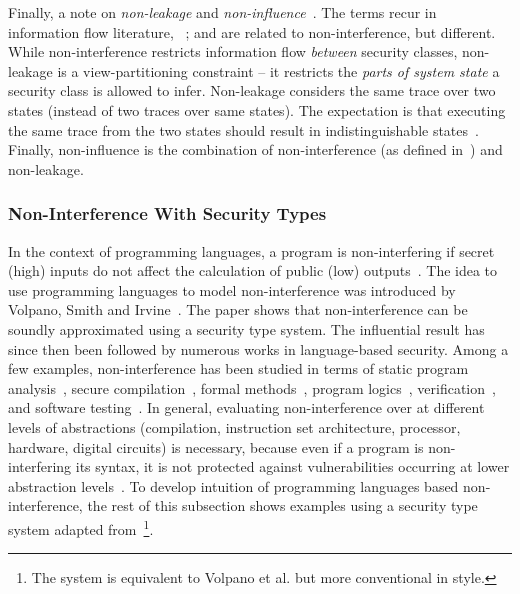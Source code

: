 Finally, a note on \emph{non-leakage} and \emph{non-influence}~\cite{vonoheimb2004}.
The terms recur in information flow literature, \eg~\cite{nelson2020,ileri2024};
and are related to {non-interference}, but different.
While non-interference restricts information flow \emph{between} security classes,
{{non-leakage}} is a view-partitioning constraint --
it restricts the \emph{parts of system state} a security class is allowed to infer.
Non-leakage considers the same trace over two states (instead of two traces over same states).
The expectation is that executing the same trace from the two states should result in indistinguishable states~\cite{nelson2020}.
Finally, {{non-influence}} is the combination of non-interference (as defined in~\cite{rushby1992}) and non-leakage.

\subsubsection{Non-Interference With Security Types}
\label{sec-types}

In the context of programming languages, a program is {non-interfering} if 
{secret (high) inputs} do not affect the calculation of {public (low) outputs}~\cite{sabelfeld2003}.
The idea to use programming languages to model {non-interference} was introduced by Volpano, Smith and Irvine~\cite{volpanoI1996}.
The paper shows that {non-interference} can be soundly approximated using a {security type system}.
The influential result has since then been followed by numerous works in language-based security.
Among a few examples, {non-interference} has been studied in terms of
static program analysis~\cite{barthe2007,huang2014},
{secure compilation}~\cite{patrignani2017,myers1999,cecchetti2017},
formal methods~\cite{kammuller2008,nelson2020},
program logics~\cite{frumin2021,karbyshev2018,garg2006,beringer2007},
verification~\cite{eilers2023},
and software {testing}~\cite{hritcu2013}.
In general, evaluating {non-interference} over at different levels of abstractions
(compilation, instruction set architecture, processor, hardware, digital circuits) is necessary,
because even if a program is {non-interfering} \wrt its syntax,
it is not protected against vulnerabilities occurring at lower abstraction levels~\cite{piessens2024}.
To develop intuition of programming languages based {non-interference},
the rest of this subsection shows examples using {a security type system} adapted from~\cite{sabelfeld2003}\footnote{
The system is equivalent to Volpano et al. but more conventional in style.}.

